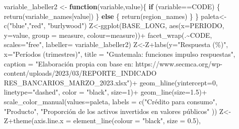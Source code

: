 \documentclass[
]{book}
\newenvironment{Shaded}{\begin{snugshade}}{\end{snugshade}}
\newcommand{\AttributeTok}[1]{\textcolor[rgb]{0.77,0.63,0.00}{#1}}
\newcommand{\ControlFlowTok}[1]{\textcolor[rgb]{0.13,0.29,0.53}{\textbf{#1}}}
\newcommand{\DecValTok}[1]{\textcolor[rgb]{0.00,0.00,0.81}{#1}}
\newcommand{\FloatTok}[1]{\textcolor[rgb]{0.00,0.00,0.81}{#1}}
\newcommand{\FunctionTok}[1]{\textcolor[rgb]{0.00,0.00,0.00}{#1}}
\newcommand{\NormalTok}[1]{#1}
\newcommand{\OtherTok}[1]{\textcolor[rgb]{0.56,0.35,0.01}{#1}}
\newcommand{\SpecialCharTok}[1]{\textcolor[rgb]{0.00,0.00,0.00}{#1}}
\newcommand{\StringTok}[1]{\textcolor[rgb]{0.31,0.60,0.02}{#1}}
\begin{document}
\begin{Shaded}
\begin{Highlighting}[]
\NormalTok{variable\_labeller2 }\OtherTok{\textless{}{-}} \ControlFlowTok{function}\NormalTok{(variable,value)\{}
  \ControlFlowTok{if}\NormalTok{ (variable}\SpecialCharTok{==}\StringTok{\textquotesingle{}CODE\textquotesingle{}}\NormalTok{) \{}
    \FunctionTok{return}\NormalTok{(variable\_names[value])}
\NormalTok{  \} }\ControlFlowTok{else}\NormalTok{ \{}
    \FunctionTok{return}\NormalTok{(region\_names)}
\NormalTok{  \}}
\NormalTok{\}}
\NormalTok{paleta}\OtherTok{\textless{}{-}}\FunctionTok{c}\NormalTok{(}\StringTok{"blue"}\NormalTok{,}\StringTok{"red"}\NormalTok{, }\StringTok{"burlywood"}\NormalTok{)}
\NormalTok{Z}\OtherTok{\textless{}{-}}\FunctionTok{ggplot}\NormalTok{(BASE\_LONG, }\FunctionTok{aes}\NormalTok{(}\AttributeTok{x=}\NormalTok{PERIODO, }\AttributeTok{y=}\NormalTok{value, }\AttributeTok{group =}\NormalTok{ measure,}
                         \AttributeTok{colour=}\NormalTok{measure))}\SpecialCharTok{+}
  \FunctionTok{facet\_wrap}\NormalTok{(.}\SpecialCharTok{\textasciitilde{}}\NormalTok{CODE, }\AttributeTok{scales=}\StringTok{"free"}\NormalTok{, }\AttributeTok{labeller=}\NormalTok{ variable\_labeller2)}
\NormalTok{Z}\OtherTok{\textless{}{-}}\NormalTok{Z}\SpecialCharTok{+}\FunctionTok{labs}\NormalTok{(}\AttributeTok{y=}\StringTok{"Respuesta (\%)"}\NormalTok{,}
          \AttributeTok{x=}\StringTok{"Períodos (trimestres)"}\NormalTok{, }\AttributeTok{title =} \StringTok{"Guatemala: funciones impulso respuestas"}\NormalTok{,}
          \AttributeTok{caption =} \StringTok{"Elaboración propia con base en: https://www.secmca.org/wp{-}content/uploads/2023/03/REPORTE\_INDICADO}
\StringTok{RES\_BANCARIOS\_MARZO\_2023.xlsx"}\NormalTok{)}\SpecialCharTok{+}
  \FunctionTok{geom\_hline}\NormalTok{(}\AttributeTok{yintercept=}\DecValTok{0}\NormalTok{, }\AttributeTok{linetype=}\StringTok{"dashed"}\NormalTok{,}
             \AttributeTok{color =} \StringTok{"black"}\NormalTok{, }\AttributeTok{size=}\DecValTok{1}\NormalTok{)}\SpecialCharTok{+}
  \FunctionTok{geom\_line}\NormalTok{(}\AttributeTok{size=}\FloatTok{1.5}\NormalTok{)}\SpecialCharTok{+}
  \FunctionTok{scale\_color\_manual}\NormalTok{(}\AttributeTok{values=}\NormalTok{paleta,}
                     \AttributeTok{labels =} \FunctionTok{c}\NormalTok{(}\StringTok{"Crédito para consumo"}\NormalTok{,}
                                \StringTok{"Producto"}\NormalTok{,}
                                \StringTok{"Proporción de los activos invertidos en valores públicos"}
\NormalTok{                                ))}
\NormalTok{Z}\OtherTok{\textless{}{-}}\NormalTok{Z}\SpecialCharTok{+}\FunctionTok{theme}\NormalTok{(}\AttributeTok{axis.line.x =} \FunctionTok{element\_line}\NormalTok{(}\AttributeTok{colour =} \StringTok{"black"}\NormalTok{, }\AttributeTok{size =} \FloatTok{0.5}\NormalTok{),}

\end{Highlighting}
\end{Shaded}
\end{document}
